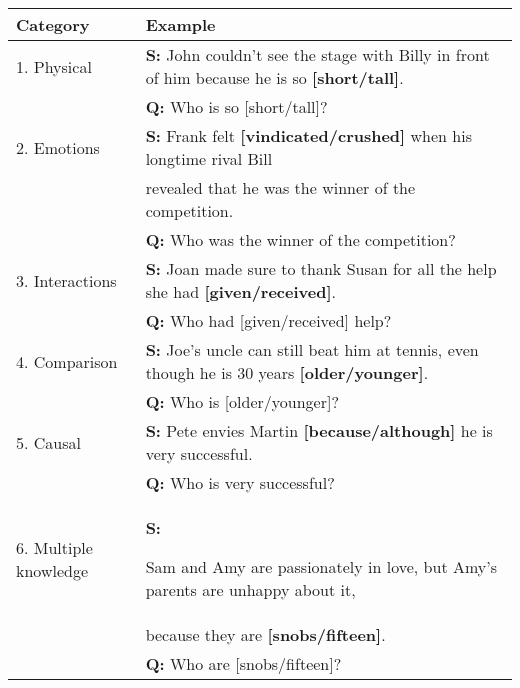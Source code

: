 


\begin{tabular}{ | l | l | }
	\hline
	\textbf{Category}  & \textbf{Example} \\ \hline
	1. Physical &\textbf{S:} John couldn't see the stage with Billy in front of him because he is so \textbf{[short/tall]}.\\&\textbf{Q:} Who is so [short/tall]? \\\hline
	
	2. Emotions &\textbf{S:}  Frank felt \textbf{[vindicated/crushed]} when his longtime rival Bill\\&revealed that he was the winner of the competition.\\&\textbf{Q:} Who was the winner of the competition?\\\hline
	
	3. Interactions &\textbf{S:} Joan made sure to thank Susan for all the help she had \textbf{[given/received]}. \\&\textbf{Q:} Who had [given/received] help?\\ \hline
	
	4. Comparison &\textbf{S:} Joe's uncle can still beat him at tennis, even though he is 30 years \textbf{[older/younger]}.\\&\textbf{Q:} Who is [older/younger]?\\ \hline
	
	5. Causal &\textbf{S:} Pete envies Martin \textbf{[because/although]} he is very successful.\\&\textbf{Q:} Who is very successful? \\ \hline 
	
	6. Multiple knowledge &\textbf{S:}  
	
	Sam and Amy are passionately in love, but Amy's parents are unhappy about it,\\& because they are \textbf{[snobs/fifteen]}.  \\&\textbf{Q:} Who are [snobs/fifteen]?\\ \hline
\end{tabular}

